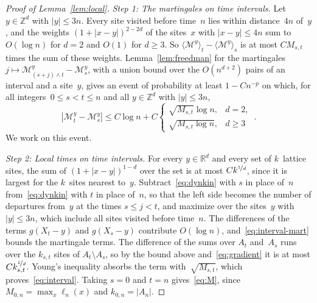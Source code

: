 \documentclass[11pt]{amsart}
\theoremstyle{plain}
\theoremstyle{definition}
\newcommand{\Z}{\mathbb Z}
\newcommand{\R}{\mathbb R}
\newcommand{\nf}{\nicefrac}
\numberwithin{equation}{section}
\begin{document}
\begin{proof}[Proof of Lemma~\ref{lem:local}]
\emph{Step 1: The martingales on time intervals.} Let $y\in\Z^d$ with $|y|\leq3n$. Every site visited before time~$n$ lies within distance~$4n$ of~$y$, and the weights $(1+|x-y|)^{2-2d}$ of the sites~$x$ with $|x-y|\leq4n$ sum to $O(\log n)$ for $d=2$ and $O(1)$ for $d\geq3$. So $\langle\mathcal M^y\rangle_t-\langle\mathcal M^y\rangle_s$ is at most $CM_{s,t}$ times the sum of these weights. Lemma~\ref{lem:freedman} for the martingales $j\mapsto\mathcal M^y_{(s+j)\wedge t}-\mathcal M^y_s$, with a union bound over the $O(n^{d+2})$ pairs of an interval and a site~$y$, gives an event of probability at least $1-Cn^{-p}$ on which, for all integers~$0\leq s<t\leq n$ and all $y\in\Z^d$ with $|y|\leq3n$,
\begin{equation}\label{eq:interval-mart}
|\mathcal M_t^y-\mathcal M_s^y|\leq C\log n+C\begin{cases}\sqrt{M_{s,t}}\log n,&d=2,\\\sqrt{M_{s,t}\log n},&d\geq3\end{cases}\, .
\end{equation}
We work on this event.

\emph{Step 2: Local times on time intervals.} For every $y\in\R^d$ and every set of $k$~lattice sites, the sum of $(1+|x-y|)^{1-d}$ over the set is at most $Ck^{\nf{1}{d}}$, since it is largest for the $k$~sites nearest to~$y$. Subtract~\eqref{eq:dynkin} with $s$ in place of~$n$ from~\eqref{eq:dynkin} with $t$ in place of~$n$, so that the left side becomes the number of departures from~$y$ at the times $s\leq j<t$, and maximize over the sites~$y$ with $|y|\leq3n$, which include all sites visited before time~$n$. The differences of the terms $g(X_t-y)$ and $g(X_s-y)$ contribute $O(\log n)$, and~\eqref{eq:interval-mart} bounds the martingale terms. The difference of the sums over $A_t$ and~$A_s$ runs over the $k_{s,t}$ sites of $A_t\setminus A_s$, so by the bound above and~\eqref{eq:gradient} it is at most $Ck_{s,t}^{\nf{1}{d}}$. Young's inequality absorbs the term with~$\sqrt{M_{s,t}}$, which proves~\eqref{eq:interval}. Taking $s=0$ and $t=n$ gives~\eqref{eq:M}, since $M_{0,n}=\max_x\ell_n(x)$ and $k_{0,n}=|A_n|$.


\end{proof}
\end{document}
